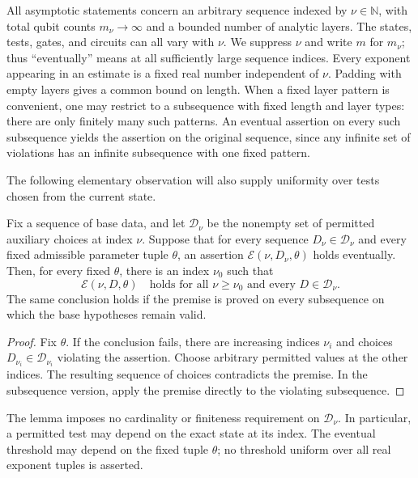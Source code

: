 All asymptotic statements concern an arbitrary sequence indexed by
$\nu\in\mathbb N$, with total qubit counts $m_\nu\to\infty$ and a bounded
number of analytic layers.  The states, tests, gates, and circuits can all
vary with $\nu$.  We suppress $\nu$ and write $m$ for $m_\nu$; thus
``eventually'' means at all sufficiently large sequence indices.  Every
exponent appearing in an estimate is a fixed real number independent of
$\nu$.  Padding with empty layers gives a common bound on length.  When a
fixed layer pattern is convenient, one may restrict to a subsequence with
fixed length and layer types: there are only finitely many such patterns.
An eventual assertion on every such subsequence yields the assertion on
the original sequence, since any infinite set of violations has an infinite
subsequence with one fixed pattern.

The following elementary observation will also supply uniformity over
tests chosen from the current state.

\begin{lemma}
\label{lem:uniformization}
Fix a sequence of base data, and let $\mathcal D_\nu$ be the nonempty set of
permitted auxiliary choices at index $\nu$.  Suppose that for every sequence
$D_\nu\in\mathcal D_\nu$ and every fixed admissible parameter tuple
$\theta$, an assertion $\mathcal E(\nu,D_\nu,\theta)$ holds eventually.
Then, for every fixed $\theta$, there is an index $\nu_0$ such that
\[
 \mathcal E(\nu,D,\theta)
 \quad\text{holds for all }\nu\ge\nu_0
 \text{ and every }D\in\mathcal D_\nu.
\]
The same conclusion holds if the premise is proved on every subsequence
on which the base hypotheses remain valid.
\end{lemma}

\begin{proof}
Fix $\theta$.  If the conclusion fails, there are increasing indices
$\nu_i$ and choices $D_{\nu_i}\in\mathcal D_{\nu_i}$ violating the
assertion.  Choose arbitrary permitted values at the other indices.  The
resulting sequence of choices contradicts the premise.  In the subsequence
version, apply the premise directly to the violating subsequence.
\end{proof}

The lemma imposes no cardinality or finiteness requirement on
$\mathcal D_\nu$.  In particular, a permitted test may depend on the exact
state at its index.  The eventual threshold may depend on the fixed tuple
$\theta$; no threshold uniform over all real exponent tuples is asserted.

